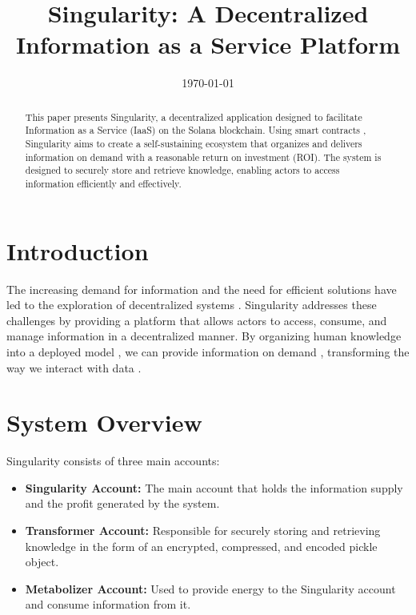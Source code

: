 \documentclass{article}
\title{Singularity: A Decentralized Information as a Service Platform}
\date{\today}
\begin{document}
\maketitlepage
\newpage

\tableofcontents
\newpage

\begin{abstract}
This paper presents Singularity, a decentralized application designed to facilitate Information as a Service (IaaS) on the Solana blockchain. Using smart contracts \cite{buterin2013}, Singularity aims to create a self-sustaining ecosystem that organizes and delivers information on demand with a reasonable return on investment (ROI). The system is designed to securely store and retrieve knowledge, enabling actors to access information efficiently and effectively.
\end{abstract}
\newpage

\makeheader	%
\maketitle	%

\section{Introduction}
The increasing demand for information \cite{ambuehl2017belief} and the need for efficient solutions \cite{benyus1997biomimicry} have led to the exploration of decentralized systems \cite{nakamoto2008}. Singularity addresses these challenges by providing a platform that allows actors to access, consume, and manage information in a decentralized manner. By organizing human knowledge into a deployed model \cite{doignon1985spaces}, we can provide information on demand \cite{bookstein1976general}, transforming the way we interact with data \cite{zyskind2015}.

\section{System Overview}
Singularity consists of three main accounts:
\begin{itemize}
    \item \textbf{Singularity Account:} The main account that holds the information supply and the profit generated by the system.
    \item \textbf{Transformer Account:} Responsible for securely storing and retrieving knowledge in the form of an encrypted, compressed, and encoded pickle object.
    \item \textbf{Metabolizer Account:} Used to provide energy to the Singularity account and consume information from it.
\end{itemize}
\end{document}

